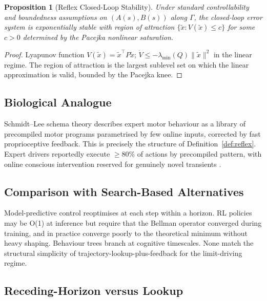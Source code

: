 \documentclass[11pt,twocolumn]{article}
\newtheorem{proposition}[theorem]{Proposition}
\theoremstyle{definition}
\theoremstyle{remark}
\begin{document}
\begin{proposition}[Reflex Closed-Loop Stability]\label{prop:reflex-stab}
Under standard controllability and boundedness assumptions on $(A(s), B(s))$ along $\Gamma$, the closed-loop error system is exponentially stable with region of attraction $\{\tilde x : V(\tilde x) \le c\}$ for some $c > 0$ determined by the Pacejka nonlinear saturation.
\end{proposition}

\begin{proof}
Lyapunov function $V(\tilde x) = \tilde x^{\top} P \tilde x$; $\dot V \le -\lambda_{\min}(Q) \|\tilde x\|^2$ in the linear regime. The region of attraction is the largest sublevel set on which the linear approximation is valid, bounded by the Pacejka knee.
\end{proof}

\subsection{Biological Analogue}

Schmidt--Lee schema theory \cite{schmidt2019motor,willingham1998motor,doyon2005reorganization} describes expert motor behaviour as a library of precompiled motor programs parametrised by few online inputs, corrected by fast proprioceptive feedback. This is precisely the structure of Definition~\ref{def:reflex}. Expert drivers reportedly execute $\ge 80\%$ of actions by precompiled pattern, with online conscious intervention reserved for genuinely novel transients \cite{willingham1998motor}.

\subsection{Comparison with Search-Based Alternatives}

Model-predictive control \cite{kelly2008controlvehicle,liniger2015optimization,rosolia2019learning} reoptimises at each step within a horizon. RL policies \cite{mnih2015human,kendall2019learning,bellemare2013arcade} may be O(1) at inference but require that the Bellman operator converged during training, and in practice converge poorly to the theoretical minimum without heavy shaping. Behaviour trees \cite{colledanchise2018behavior} branch at cognitive timescales. None match the structural simplicity of trajectory-lookup-plus-feedback for the limit-driving regime.

\subsection{Receding-Horizon versus Lookup}
\end{document}
